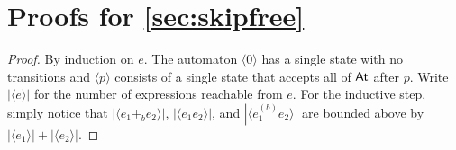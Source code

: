 \documentclass[orivec,envcountsect,envcountsame]{llncs}
\begin{document}
\section{Proofs for \cref{sec:skipfree}}

\lemlocalfiniteness*

\begin{proof}
	By induction on \(e\).
	The automaton \(\langle 0\rangle\) has a single state with no transitions and \(\langle p \rangle\) consists of a single state that accepts all of \(\mathsf{At}\) after \(p\).
	Write \(|\langle e\rangle|\) for the number of expressions reachable from \(e\).
	For the inductive step, simply notice that \(|\langle e_1 +_b e_2\rangle|\), \(|\langle e_1e_2\rangle|\), and \(|\langle e_1^{(b)}e_2\rangle|\) are bounded above by \(|\langle e_1\rangle| + |\langle e_2\rangle|\).
\end{proof}

\lemlanguagecomputation*
\end{document}
